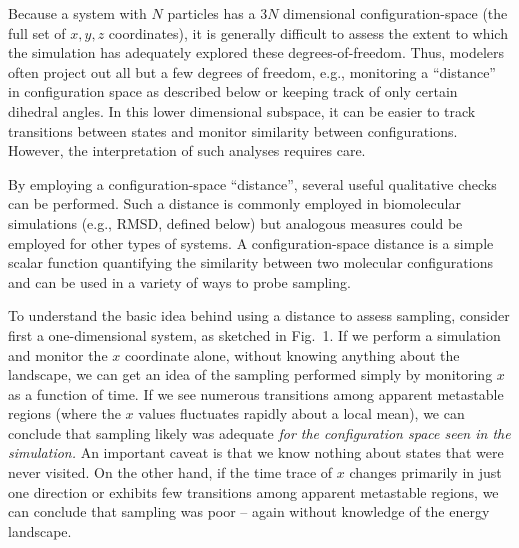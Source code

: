 Because a system with $N$ particles has a $3N$ dimensional configuration-space (the full set of $x, y, z$ coordinates), it is generally difficult to assess the extent to which the simulation has adequately explored these degrees-of-freedom.  Thus, modelers often project out all but a few degrees of freedom, e.g., monitoring a ``distance'' in configuration space as described below or keeping track of only certain dihedral angles.  In this lower dimensional subspace, it can be easier to track transitions between states and monitor similarity between configurations.  However, the interpretation of such analyses requires care.

By employing a configuration-space ``distance'', several useful qualitative checks can be performed.
Such a distance is commonly employed in biomolecular simulations (e.g., RMSD, defined below) but analogous measures could be employed for other types of systems.
A configuration-space distance is a simple scalar function quantifying the similarity between two molecular configurations and can be used in a variety of ways to probe sampling.

To understand the basic idea behind using a distance to assess sampling, consider first a one-dimensional system, as sketched in Fig.\ 1.  If we perform a simulation and monitor the $x$ coordinate alone, without knowing anything about the landscape, we can get an idea of the sampling performed simply by monitoring $x$ as a function of time.  If we see numerous transitions among apparent metastable regions (where the $x$ values fluctuates rapidly about a local mean), we can conclude that sampling likely was adequate \emph{for the configuration space seen in the simulation.}  An important caveat is that we know nothing about states that were never visited.  On the other hand, if the time trace of $x$ changes primarily in just one direction or exhibits few transitions among apparent metastable regions, we can conclude that sampling was poor -- again without knowledge of the energy landscape.

